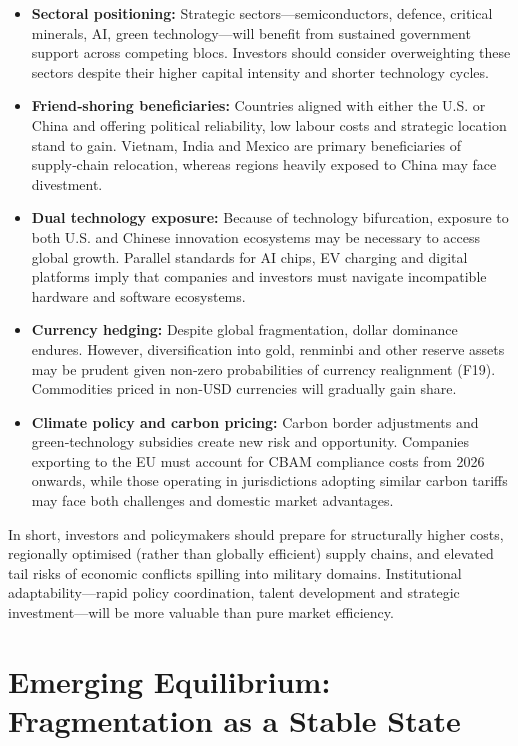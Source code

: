 \documentclass[12pt]{article}
\begin{document}
\begin{itemize}
\item \textbf{Sectoral positioning:}  Strategic sectors—semiconductors, defence, critical minerals, AI, green technology—will benefit from sustained government support across competing blocs.  Investors should consider overweighting these sectors despite their higher capital intensity and shorter technology cycles.

\item \textbf{Friend‑shoring beneficiaries:}  Countries aligned with either the U.S. or China and offering political reliability, low labour costs and strategic location stand to gain.  Vietnam, India and Mexico are primary beneficiaries of supply‑chain relocation, whereas regions heavily exposed to China may face divestment.

\item \textbf{Dual technology exposure:}  Because of technology bifurcation, exposure to both U.S. and Chinese innovation ecosystems may be necessary to access global growth.  Parallel standards for AI chips, EV charging and digital platforms imply that companies and investors must navigate incompatible hardware and software ecosystems.

\item \textbf{Currency hedging:}  Despite global fragmentation, dollar dominance endures.  However, diversification into gold, renminbi and other reserve assets may be prudent given non‑zero probabilities of currency realignment (F19).  Commodities priced in non‑USD currencies will gradually gain share.

\item \textbf{Climate policy and carbon pricing:}  Carbon border adjustments and green‑technology subsidies create new risk and opportunity.  Companies exporting to the EU must account for CBAM compliance costs from 2026 onwards, while those operating in jurisdictions adopting similar carbon tariffs may face both challenges and domestic market advantages.
\end{itemize}

In short, investors and policymakers should prepare for structurally higher costs, regionally optimised (rather than globally efficient) supply chains, and elevated tail risks of economic conflicts spilling into military domains.  Institutional adaptability—rapid policy coordination, talent development and strategic investment—will be more valuable than pure market efficiency.

\section{Emerging Equilibrium: Fragmentation as a Stable State}
\end{document}
